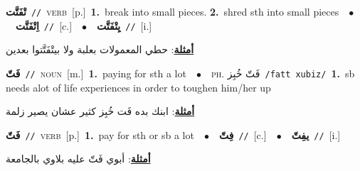 \documentclass[10pt,a4paper,twoside]{article} %
\begin{document}
\begin{multicols}{2}
{\setlength\topsep{0pt}\textbf{\foreignlanguage{arabic}{تْفَتَّت}}\ {\color{gray}\texttt{//}\color{black}}\ \textsc{verb}\ [p.]\ \textbf{1.}~break into small pieces.  \textbf{2.}~shred sth into small pieces\ \ $\bullet$\ \ \setlength\topsep{0pt}\textbf{\foreignlanguage{arabic}{اِتْفَتَّت}}\ {\color{gray}\texttt{//}\color{black}}\ [c.]\ \ $\bullet$\ \ \setlength\topsep{0pt}\textbf{\foreignlanguage{arabic}{يِتْفَتَّت}}\ {\color{gray}\texttt{//}\color{black}}\ [i.]\  \begin{flushright}\color{gray}\foreignlanguage{arabic}{\textbf{\underline{\foreignlanguage{arabic}{أمثلة}}}: حطي المعمولات بعلبة ولا بيتْفَتَّتوا بعدين}\end{flushright}\color{black}} \vspace{2mm}

{\setlength\topsep{0pt}\textbf{\foreignlanguage{arabic}{فَتّ}}\ {\color{gray}\texttt{//}\color{black}}\ \textsc{noun}\ [m.]\ \textbf{1.}~paying for sth a lot\ \ $\bullet$\ \ \textsc{ph.} \color{gray} \foreignlanguage{arabic}{فَتّ خُبِز}\color{black}\ {\color{gray}\texttt{/{\sffamily fatt xubiz}/}\color{black}}\ \textbf{1.}~sb needs alot of life experiences in order to toughen him/her up\  \begin{flushright}\color{gray}\foreignlanguage{arabic}{\textbf{\underline{\foreignlanguage{arabic}{أمثلة}}}: ابنك بده فَت خُبِز كثير عشان يصير زلمة}\end{flushright}\color{black}} \vspace{2mm}

{\setlength\topsep{0pt}\textbf{\foreignlanguage{arabic}{فَتّ}}\ {\color{gray}\texttt{//}\color{black}}\ \textsc{verb}\ [p.]\ \textbf{1.}~pay for sth or sb a lot\ \ $\bullet$\ \ \setlength\topsep{0pt}\textbf{\foreignlanguage{arabic}{فِتّ}}\ {\color{gray}\texttt{//}\color{black}}\ [c.]\ \ $\bullet$\ \ \setlength\topsep{0pt}\textbf{\foreignlanguage{arabic}{يفِتّ}}\ {\color{gray}\texttt{//}\color{black}}\ [i.]\  \begin{flushright}\color{gray}\foreignlanguage{arabic}{\textbf{\underline{\foreignlanguage{arabic}{أمثلة}}}: أبوي فَتّ عليه بلاوي بالجامعة}\end{flushright}\color{black}} \vspace{2mm}


\end{multicols}
\end{document}
